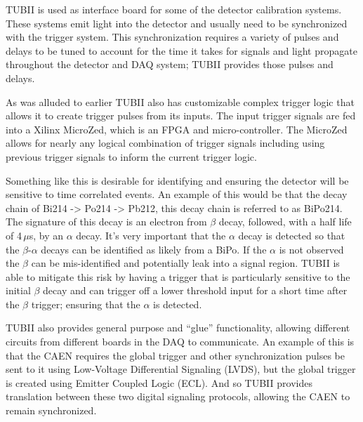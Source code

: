 TUBII is used as interface board for some of the detector calibration systems.
These systems emit light into the detector and usually need to be
synchronized with the trigger system. This synchronization requires
a variety of pulses and delays to be tuned to account for the time it
takes for signals and light propagate throughout the detector and DAQ
system; TUBII provides those pulses and delays.

As was alluded to earlier TUBII also has customizable complex trigger logic that
allows it to create trigger pulses from its inputs.
The input trigger signals are fed into a Xilinx MicroZed, which is an FPGA and
micro-controller.
The MicroZed allows for nearly any logical combination of trigger signals including
using previous trigger signals to inform the current trigger logic.

Something like this is desirable for identifying and ensuring the detector will
be sensitive to time correlated events. An example of this would be that
the decay chain of Bi214 -> Po214 -> Pb212, this decay chain is referred to as BiPo214. %
The signature of this decay is an electron from $\beta$ decay, followed, with a half
life of 4\,$\mu$s, by an $\alpha$ decay.
It's very important that the $\alpha$ decay is detected so that the $\beta$-$\alpha$
decays can be identified as likely from a BiPo. If the $\alpha$ is not observed
the $\beta$ can be mis-identified and potentially leak into a signal region.
TUBII is able to mitigate this risk by having a trigger that is particularly
sensitive to the initial $\beta$ decay and can trigger off a lower
threshold input for a short time after the $\beta$ trigger; ensuring that
the $\alpha$ is detected.

TUBII also provides general purpose and ``glue'' functionality,
allowing different circuits from different boards in the DAQ to communicate.
An example of this is that the CAEN requires the global trigger and
other synchronization pulses be sent to it using Low-Voltage Differential
Signaling (LVDS), but the global trigger is created using Emitter Coupled
Logic (ECL).
And so TUBII provides translation between these two digital signaling protocols,
allowing the CAEN to remain synchronized.


